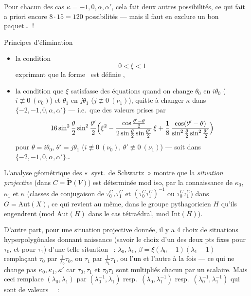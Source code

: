 \documentclass[11pt,a4paper]{article}
\begin{document}
Pour chacun des  cas $\kappa = -1, 0, \alpha, \alpha'$,
cela fait deux autres possibilités, ce qui fait a priori encore
$8 \cdot 15 = 120$ possibilités --- mais il faut en exclure un bon
paquet\ldots~!

Principes d'élimination
\begin{itemize}
\item[a)] la condition
\[
0 < \xi < 1
\]
exprimant que la forme \struck{\ill{}} \ est définie
,
\item[b)] la condition que $\xi$ satisfasse des équations  quand on
change $\theta_0$ en $i\theta_0$ ($i \not\equiv 0\ (\nu_0)$) et $\theta_1$
en $j\theta_1$ ($j \not\equiv 0\ (\nu_1)$), quitte à changer $\kappa$ dans
$\lbrace -2, -1, 0, \alpha, \alpha' \rbrace$ --- i.e.\ que \ill{} des
valeurs prises par
\[
16\sin^2\frac{\theta}{2}\sin^2\frac{\theta'}{2}
\Bigl(\xi^2 - \frac{\cos\frac{\theta' - \theta}{2}}{2\sin\frac{\theta}{2}\sin\frac{\theta'}{2}}\,\xi
+ \frac{1}{8}\,\frac{\cos(\theta' - \theta)}{\sin^2\frac{\theta}{2}\sin^2\frac{\theta'}{2}}\Bigr)
\]
pour $\theta = i\theta_0$, $\theta' = j\theta_1$ ($i \not\equiv 0\ (\nu_0)$,
$\theta' \not\equiv 0\ (\nu_1)$) --- soit dans
$\lbrace -2, -1, 0, \alpha, \alpha' \rbrace$\ldots
\end{itemize}

L'analyse géométrique des «~syst.\ de Schwartz~» montre que la
\emph{situation projective} (dans $C = \check{\mathbf{P}}(V)$) est
déterminée mod iso, par la connaissance de $\kappa_0$, $\kappa_1$ et
$\kappa$  (classes de
conjugaison de $\tau_0^{C}, \tau_1^{C}$ et $(\tau_0^{C}\tau_1^{C})^{-1}$ ou
$\tau_0^{C}\tau_1^{C}$) dans  $G = \mathrm{Aut}(X)$,
 ce qui revient au même, dans le groupe pythagoricien $H$ qu'ils
engendrent (mod $\mathrm{Aut}(H)$ dans le cas tétraédral,  mod
$\mathrm{Int}(H)$).

D'autre part, pour une situation projective donnée, il y a 4 choix de
situations hyperpolygônales  donnant naissance (savoir le choix d'un
des deux pts fixes pour $\tau_0$, et pour $\tau_1$)  d'une telle
situation ~: $\lambda_0, \lambda_1$,
$\beta = \xi(\lambda_0 - 1)(\lambda_1 - 1)$  remplaçant
$\tau_0$ par $\frac{1}{\lambda_0}\tau_0$, ou $\tau_1$ par
$\frac{1}{\lambda_1}\tau_1$, ou l'un et l'autre à la fois --- ce qui ne
change pas $\kappa_0, \kappa_1, \kappa'$ car $\tau_0, \tau_1$ et
$\tau_0\tau_1$ sont multipliés chacun par un scalaire.  Mais ceci remplace $(\lambda_0, \lambda_1)$ par
$(\lambda_0^{-1}, \lambda_1)$ resp.\ $(\lambda_0, \lambda_1^{-1})$ resp.\
$(\lambda_0^{-1}, \lambda_1^{-1})$ qui sont 
\add{«~en général~»} \uncertain{un système} de valeurs \uncertain{diff.}\
\struck{\ill{}}~:
\end{document}
